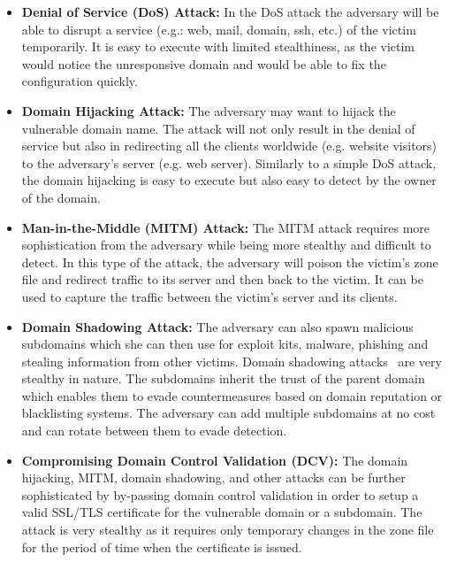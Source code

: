 \begin{itemize}

\item \textbf{Denial of Service (DoS) Attack:} In the DoS attack the adversary will be able to disrupt a service (e.g.: web, mail, domain, ssh, etc.) of the victim temporarily. 
It is easy to execute with limited stealthiness, as the victim would notice the unresponsive domain and would be able to fix the configuration quickly. 

\item \textbf{Domain Hijacking Attack:} The adversary may want to hijack the vulnerable domain name. 
The attack will not only result in the denial of service but also in redirecting all the clients worldwide (e.g. website visitors) to the adversary's server (e.g. web server).
Similarly to a simple DoS attack, the domain hijacking is easy to execute but also easy to detect by the owner of the domain.

\item \textbf{Man-in-the-Middle (MITM) Attack:} The MITM attack requires more sophistication from the adversary while being more stealthy and difficult to detect. In this type of the attack, %
the adversary will %
poison the victim's zone file and redirect traffic to its server and then back to the victim. %
It can be used to capture the traffic between the victim's server and its clients. %

\item \textbf{Domain
Shadowing Attack:} %
The adversary %
can also spawn malicious subdomains which she can then use for exploit kits, malware, phishing and stealing information from other victims. 
Domain shadowing attacks~\cite{shadowing} are %
very stealthy in nature. 
The subdomains inherit the trust of the parent domain which enables them to evade countermeasures based on domain reputation or blacklisting systems. 
The adversary can %
add multiple subdomains at no cost and can rotate between them to evade detection. 

\item \textbf{Compromising Domain Control Validation (DCV):}
The domain hijacking, MITM, domain shadowing, and other attacks can be further sophisticated by by-passing domain control validation in order to setup a valid SSL/TLS certificate for the vulnerable domain or a subdomain.
The attack is very stealthy as it requires only temporary changes in the zone file for the period of time when the certificate is issued.

\end{itemize}



